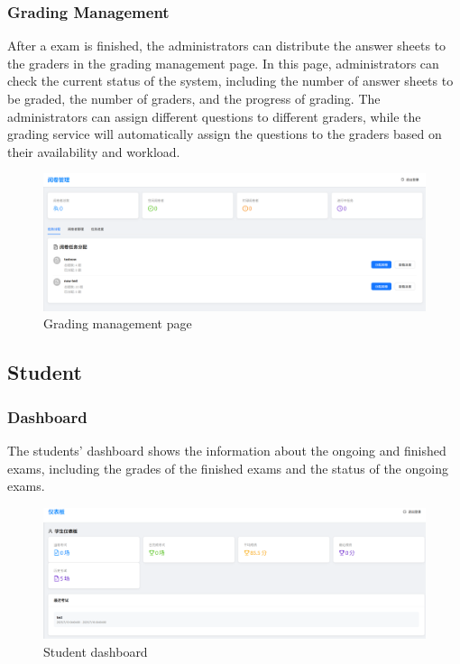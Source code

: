 \documentclass[12pt]{article}
\begin{document}
\subsubsection{Grading Management}
After a exam is finished, the administrators can distribute the answer sheets to the graders in the grading management page.
In this page, administrators can check the current status of the system, including the number of answer sheets to be graded, the number of graders,
and the progress of grading. The administrators can assign different questions to different graders, while the grading service
will automatically assign the questions to the graders based on their availability and workload.
\begin{figure}[H]
    \centering
    \includegraphics[width=\textwidth]{admin/gradermanage.png}
    \caption{Grading management page}
    \label{fig:GradingManagement page}
\end{figure}
\subsection{Student}
\subsubsection{Dashboard}
The students' dashboard shows the information about the ongoing and finished exams, including the grades of the finished exams and the status of the ongoing exams.
\begin{figure}[H]
    \centering
    \includegraphics[width=\textwidth]{student/dashboard.png}
    \caption{Student dashboard}
    \label{fig:StudentDashboard page}
\end{figure}
\end{document}
